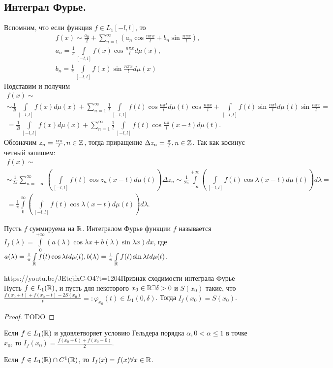 \subsection{Интеграл Фурье.}
Вспомним, что если функция $f\in L_1[-l,l]$, то 
\begin{align*}
	f(x)\sim\frac{a_0}{2}+\sum\limits_{n=1}^\infty \left(a_n\cos\frac{n\pi x}{l}+b_n\sin\frac{n\pi x}{l}\right),\\
	a_n=\frac{1}{\pi}\int\limits_{[-l,l]}f(x)\cos\frac{n\pi x}{l}d\mu(x),\\
	b_n=\frac{1}{\pi}\int\limits_{[-l,l]}f(x)\sin\frac{n\pi x}{l}d\mu(x)
\end{align*}
Подставим и получим
\begin{multline*}
	f(x)\sim\\\sim\frac{1}{2l}\int\limits_{[-l,l]}f(x)d\mu(x)+\sum\limits_{n=1}^\infty\frac{1}{l}\int\limits_{[-l,l]}f(t)\cos\frac{n\pi t}{l}d\mu(t)\cos\frac{n\pi x}{l}+\int\limits_{[-l,l]}f(t)\sin\frac{n\pi t}{l}d\mu(t)\sin\frac{n\pi x}{l}=\\=
	\frac{1}{2l}\int\limits_{[-l,l]}f(x)d\mu(x)+\sum\limits_{n=1}^\infty\frac{1}{l}\int\limits_{[-l,l]}f(t)\cos\frac{n\pi}{l}(x-t)d\mu(t).
\end{multline*}
Обозначим $z_n=\frac{n\pi}{l}, n\in\mathbb{Z}$, тогда приращение $\Delta z_n=\frac{\pi}{l}, n\in\mathbb{Z}$. Так как косинус четный запишем:
\begin{multline*}
	f(x)\sim\\\sim\frac{1}{2\pi}\sum\limits_{n=-\infty}^\infty\left(\int\limits_{[-l,l]}f(t)\cos z_n(x-t)d\mu(t) \right)\Delta z_n\sim\frac{1}{2\pi}\int\limits_{-\infty}^{+\infty}\left(\int\limits_{[-l,l]} f(t)\cos\lambda(x-t)d\mu(t)\right)d\lambda=\\=\frac{1}{\pi}\int\limits_0^\infty\left(\int\limits_{[-l,l]}f(t)\cos\lambda(x-t)d\mu(t)\right)d\lambda.
\end{multline*}

\begin{Def}
	Пусть $f$ суммируема на $\mathbb{R}$. Интегралом Фурье функции $f$ называется $I_f(\lambda)=\int\limits_0^{+\infty}(a(\lambda)\cos\lambda x+b(\lambda)\sin\lambda x)dx$, где $a(\lambda)=\frac{1}{\pi}\int\limits_{\mathbb{R}} f(t)\cos\lambda td\mu(t),
	b(\lambda)=\frac{1}{\pi}\int\limits_{\mathbb{R}} f(t)\sin\lambda td\mu(t)$.
\end{Def}

\begin{linkthm}{https://youtu.be/JEtcjfxC-O4?t=1204}{Признак сходимости интеграла Фурье}\ \\
	Пусть $f\in L_1(\mathbb{R})$,  и пусть для некоторого $x_0\in \mathbb{R} \exists\delta>0$ и $S(x_0)$ такие, что $\frac{f(x_0+t)+f(x_0-t)-2S(x_0)}{t}=:\varphi_{x_0}(t)\in L_1(0,
\delta)$. Тогда $I_f(x_0)=S(x_0)$.
\end{linkthm}
\begin{proof}
TODO
\end{proof}
\begin{corollary}
	Если $f\in L_1(\mathbb{R})$ и удовлетворяет условию Гельдера порядка $\alpha, 0<\alpha\leqslant 1$ в точке $x_0$, то $I_f(x_0)=\frac{f(x_0+0)+f(x_0-0)}{2}$.
	
	Если $f\in L_1(\mathbb{R})\cap C^1(\mathbb{R})$, то $I_f(x)=f(x)\forall x\in\mathbb{R}$.
\end{corollary}


